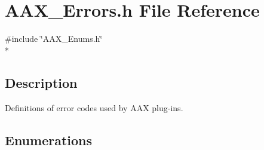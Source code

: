 \hypertarget{a00207}{}\section{A\+A\+X\+\_\+\+Errors.\+h File Reference}
\label{a00207}
{\ttfamily \#include \char`\"{}A\+A\+X\+\_\+\+Enums.\+h\char`\"{}}\\*


\subsection{Description}
Definitions of error codes used by A\+A\+X plug-\/ins. 

\subsection*{Enumerations}
